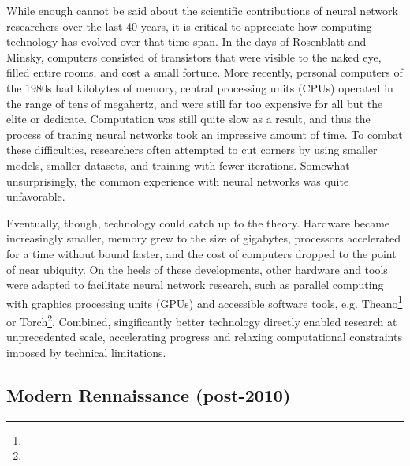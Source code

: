 While enough cannot be said about the scientific contributions of neural network researchers over the last 40 years, it is critical to appreciate how computing technology has evolved over that time span.
In the days of Rosenblatt and Minsky, computers consisted of transistors that were visible to the naked eye, filled entire rooms, and cost a small fortune.
More recently, personal computers of the 1980s had kilobytes of memory, central processing units (CPUs) operated in the range of tens of megahertz, and were still far too expensive for all but the elite or dedicate.
Computation was still quite slow as a result, and thus the process of traning neural networks took an impressive amount of time.
To combat these difficulties, researchers often attempted to cut corners by using smaller models, smaller datasets, and training with fewer iterations.
Somewhat unsurprisingly, the common experience with neural networks was quite unfavorable.

Eventually, though, technology could catch up to the theory.
Hardware became increasingly smaller, memory grew to the size of gigabytes, processors accelerated for a time without bound faster, and the cost of computers dropped to the point of near ubiquity.
On the heels of these developments, other hardware and tools were adapted to facilitate neural network research, such as parallel computing with graphics processing units (GPUs) and accessible software tools, e.g. Theano\footnote{} or Torch\footnote{}.
Combined, singificantly better technology directly enabled research at unprecedented scale, accelerating progress and relaxing computational constraints imposed by technical limitations.



\subsection{Modern Rennaissance (post-2010)}
\label{subsec:rennaissance}

